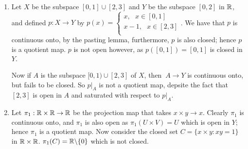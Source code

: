 \begin{example}
    \begin{enumerate}[label=(\arabic*)]
        \item Let $X$ be the subspace  $[0,1] \cup [2,3]$ and $Y$ be the subspace  $[0,2]$ in $\mathbb{R}$,
            and defined  $p:X \rightarrow Y$ by  $p(x)=\begin{cases}
                                                x, \text{ } x \in [0,1] \\
                                                x-1, \text{ } x \in [2,3] \\
                                            \end{cases}$.
        We have that $p$ is continuous onto, by the pasting lemma, furthermore,  $p$ is also closed;
        hence  $p$ is a quotient map.  $p$ is not open however, as  $p([0,1])=[0,1]$ is closed in
        $Y$.

        Now if  $A$ is the subspace  $[0,1) \cup [2,3]$ of $X$, then  $\:A \rightarrow Y$ is
        continuous onto, but fails to be closed. So  $p|_A$ is not a quotient map, depsite the fact
        that  $[2,3]$ is open in $A$ and saturated with respect to  $p|_A$.

        \item Let $\pi_1:\mathbb{R} \times \mathbb{R} \rightarrow \mathbb{R}$ be the projection map that takes $x \times y
            \rightarrow x$. Clearly  $\pi_1$ is continuous onto, and $\pi_1$ is also open as
            $\pi_1(U \times V)=U$ which is open in $Y$; hence  $\pi_1$ is a quotient map. Now
            consider the closed set $C=\{x \times y:xy=1\}$ in $\mathbb{R} \times \mathbb{R}$.
            $\pi_1(C)=\mathbb{R} \backslash \{0\}$ which is not closed.
    \end{enumerate}
\end{example} 

